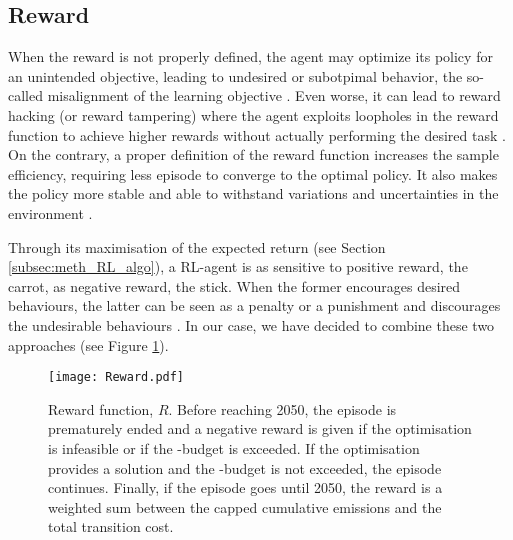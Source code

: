 \subsection{Reward}
\label{subsec:RL:act_states_rew:rew}

When the reward is not properly defined, the agent may optimize its policy for an unintended objective, leading to undesired or subotpimal behavior, \ie the so-called misalignment of the learning objective \cite{christiano2017deep}. Even worse, it can lead to reward hacking (or reward tampering) where the agent exploits loopholes in the reward function to achieve higher rewards without actually performing the desired task \cite{amodei2016concrete}. On the contrary, a proper definition of the reward function increases the sample efficiency, \ie requiring less episode to converge to the optimal policy.  It also makes the policy more stable and able to withstand variations and uncertainties in the environment \cite{henderson2018deep}.

Through its maximisation of the expected return (see Section \ref{subsec:meth_RL_algo}), a \gls{RL}-agent is as sensitive to positive reward, \ie the carrot, as negative reward, \ie the stick.  When the former encourages desired behaviours, the latter can be seen as a penalty or a punishment and discourages the undesirable behaviours \cite{sutton2018reinforcement}. In our case, we have decided to combine these two approaches (see Figure \ref{fig:Reward}).

\begin{figure}[!htbp]
\centering
\texttt{[image: Reward.pdf]}
\caption{Reward function, $R$. Before reaching 2050, the episode is prematurely ended and a negative reward is given if the optimisation is infeasible or if the -budget is exceeded. If the optimisation provides a solution and the -budget is not exceeded, the episode continues. Finally, if the episode goes until 2050, the reward is a weighted sum between the capped cumulative emissions and the total transition cost.}
\label{fig:Reward}
\end{figure} 


